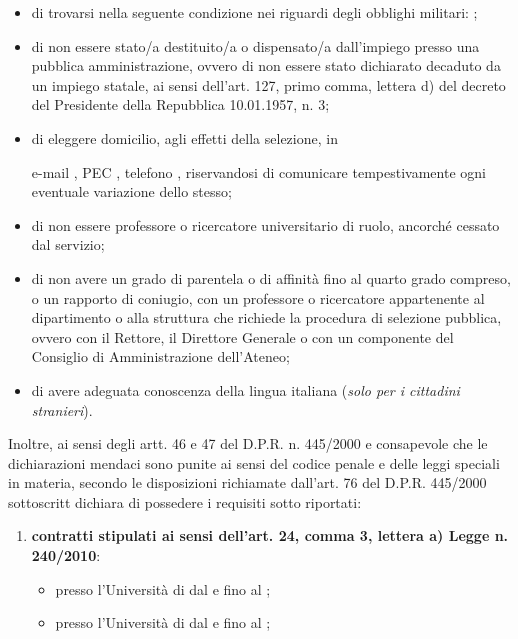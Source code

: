 \documentclass[a4paper,10pt]{article}
\begin{document}
\begin{Form}
\begin{itemize}
\myTextField[.9\textwidth]{}
\item di trovarsi nella seguente condizione nei riguardi degli obblighi militari: 
\myTextField{};
\item di non essere stato/a destituito/a o dispensato/a dall'impiego presso una 
pubblica amministrazione, ovvero di non essere stato dichiarato decaduto da un 
impiego statale, ai sensi dell'art. 127, primo comma, lettera d) del decreto 
del Presidente della Repubblica 10.01.1957, n. 3;
\item di eleggere domicilio, agli effetti della selezione, in 
\begin{center}
 \titleTextField[6cm]{}%
\end{center} 
e-mail \myTextField[4cm]{}, PEC \myTextField[4cm]{}, telefono \myTextField{}, 
riservandosi di comunicare tempestivamente ogni eventuale variazione dello stesso;
\item di non essere professore o ricercatore universitario di ruolo, ancorché 
cessato dal servizio;
\item di non avere un grado di parentela o di affinità fino al quarto grado 
compreso, o un rapporto di coniugio, con un professore o ricercatore appartenente 
al dipartimento o alla struttura che richiede la procedura di selezione pubblica, 
ovvero con il Rettore, il Direttore Generale o con un componente del Consiglio 
di Amministrazione dell’Ateneo;
\item di avere adeguata conoscenza della lingua italiana (\emph{solo per i 
cittadini stranieri}).
\end{itemize}
Inoltre, ai sensi degli artt. 46 e 47 del D.P.R. n. 445/2000 e consapevole che 
le dichiarazioni mendaci sono punite ai sensi del codice penale e delle leggi 
speciali in materia, secondo le disposizioni richiamate dall’art. 76 del D.P.R. 
445/2000  \myTextField[.5cm]{} sottoscritt\myTextField[.5cm]{} dichiara di 
possedere i requisiti sotto riportati:
\begin{enumerate}
\item \textbf{contratti stipulati ai sensi dell'art. 24, comma 3, lettera a) 
Legge n. 240/2010}:
\begin{itemize}
 \item presso l’Università di \myTextField[4.5cm]{} dal \myTextField{} e fino 
 al \myTextField{};
 \item presso l’Università di \myTextField[4.5cm]{} dal \myTextField{} e fino 
 al \myTextField{};
\end{itemize}

\end{enumerate}
\end{Form}
\end{document}
